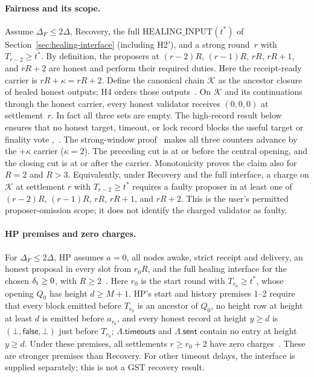\documentclass{article}
\theoremstyle{plain}
\theoremstyle{definition}
\theoremstyle{remark}
\begin{document}
\paragraph{Fairness and its scope.}
Assume $\Delta_F\leq2\Delta$, Recovery, the full $\mathrm{HEALING\_INPUT}(t^*)$ of
Section~\ref{sec:healing-interface} (including H2$'$), and a strong
round~$r$ with $T_{r-2}\geq t^*$.
By definition, the proposers at $(r-2)R$, $(r-1)R$, $rR$, $rR+1$, and $rR+2$
are honest and perform their required duties.  Here the receipt-ready
carrier is $rR+\kappa=rR+2$.  Define the canonical
chain $\mathcal K$ as the ancestor closure of healed honest outputs; H4 orders
those outputs~\cite[\S5]{LS183}.  On $\mathcal K$ and its continuations through
the honest carrier, every honest validator receives $(0,0,0)$
at settlement~$r$.  In fact all three sets are empty.
The high-record result below ensures that no honest target, timeout,
or lock record blocks the useful target or finality vote
\cite[FF2]{BPF},~\cite[\S4]{SL175}.
The strong-window proof~\cite[FF3--FF4]{BPF} makes all three counters
advance by the +$\kappa$ carrier ($\kappa=2$).  The preceding cut is at or before the
central opening, and the closing cut is at or after the carrier.
Monotonicity proves the claim also for $R=2$ and $R>3$.
Equivalently, under Recovery and the full interface, a charge on $\mathcal K$
at settlement $r$ with $T_{r-2}\geq t^*$ requires a faulty proposer
in at least one of $(r-2)R$, $(r-1)R$, $rR$, $rR+1$, and $rR+2$.
This is the user's permitted proposer-omission scope; it does not
identify the charged validator as faulty.

\paragraph{HP premises and zero charges.}
For $\Delta_F\leq2\Delta$, HP assumes $a=0$, all nodes awake, strict receipt and delivery, an
honest proposal in every slot from $r_0R$, and the full healing
interface for the chosen $\delta_{\rm t}\geq0$, with $R\geq2$~\cite[HP]{BPF}.  Here $r_0$ is the start round with
$T_{r_0}\geq t^*$, whose opening $Q_0$ has height $d\geq M+1$.
HP's start and history premises 1--2 require that every block emitted
before $T_{r_0}$ is an ancestor of $Q_0$, no height row at height at
least $d$ is emitted before $a_{r_0}$, and every honest record at
height $y\geq d$ is $(\bot,\mathsf{false},\bot)$ just before
$T_{r_0}$; $\Lambda.\mathsf{timeouts}$ and $\Lambda.\mathsf{sent}$
contain no entry at height $y\geq d$.  Under these premises, all settlements $r\geq r_0+2$
have zero charges~\cite[\S5]{LS183}.  These are stronger premises
than Recovery.  For other timeout delays, the interface is supplied
separately; this is not a GST recovery result.
\end{document}
